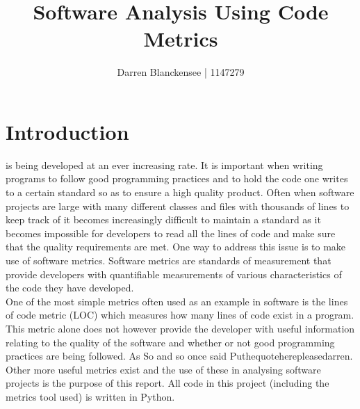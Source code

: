\documentclass[11pt,journal, a4paper]{IEEEtran}
\title{\LARGE {Software  Analysis Using Code Metrics}}
\author{\small {Darren Blanckensee | 1147279}}
\begin{document}
	
	\maketitle


\begin{abstract}

\end{abstract}



\section{Introduction}
\noindent
{} is being developed at an ever increasing rate. It is important when writing programs to follow good programming practices and to hold the code one writes to a certain standard so as to ensure a high quality product. Often when software projects are large with many different classes and files with thousands of lines to keep track of it becomes increasingly difficult to maintain a standard as it becomes impossible for developers to read all the lines of code and make sure that the quality requirements are met. One way to address this issue is to make use of software metrics. Software metrics are standards of measurement that provide developers with quantifiable measurements of various characteristics of the code they have developed. \\

\noindent
One of the most simple metrics often used as an example in software is the lines of code metric (LOC) which measures how many lines of code exist in a program. This metric alone does not however provide the developer with useful information relating to the quality of the software and whether or not good programming practices are being followed. As So and so once said Puthequoteherepleasedarren. Other more useful metrics exist and the use of these in analysing software projects is the purpose of this report. All code in this project (including the metrics tool used) is written in Python.  \\
\end{document}
